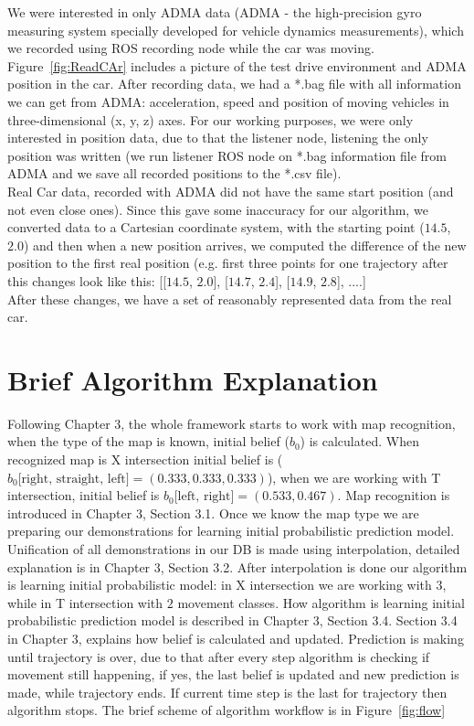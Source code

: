 We were interested in only \gls{ADMA} data (\gls{ADMA} - the high-precision gyro measuring system specially developed for vehicle dynamics measurements), which we recorded using \gls{ROS} recording node while the car was moving. Figure~\ref{fig:ReadCAr} includes a picture of the test drive environment and \gls{ADMA} position in the car. After recording data, we had a *.bag file with all information we can get from \gls{ADMA}: acceleration, speed and position of moving vehicles in three-dimensional (x, y, z) axes. For our working purposes, we were only interested in position data, due to that the listener node, listening the only position was written (we run listener \gls{ROS} node on *.bag information file from \gls{ADMA} and we save all recorded positions to the *.csv file). \\
Real Car data, recorded with \gls{ADMA} did not have the same start position (and not even close ones). Since this gave some inaccuracy for our algorithm, we converted data to a Cartesian coordinate system, with the starting point ($14.5$, $2.0$) and then when a new position arrives, we computed the difference of the new position to the first real position (e.g. first three points for one trajectory after this changes look like this: [[$14.5$, $2.0$], [$14.7$, $2.4$], [$14.9$, $2.8$], ....] \\
After these changes, we have a set of reasonably represented data from the real car.

\section{Brief Algorithm Explanation}

Following Chapter 3, the whole framework starts to work with map recognition, when the type of the map is known, initial belief ($b_{0}$) is calculated. When recognized map is X intersection initial belief is ($b_{0}\text{[right, straight, left]} = (0.333, 0.333, 0.333)$), when we are working with T intersection, initial belief is $b_0 \text{[left, right]}= (0.533, 0.467)$. Map recognition is introduced in Chapter 3, Section 3.1.
Once we know the map type we are preparing our demonstrations for learning initial probabilistic prediction model. Unification of all demonstrations in our \gls{DB} is made using interpolation, detailed explanation is in Chapter 3, Section 3.2. After interpolation is done our algorithm is learning initial probabilistic model: in X intersection we are working with $3$, while in T intersection with $2$ movement classes. How algorithm is learning initial probabilistic prediction model is described in Chapter 3, Section 3.4.
Section 3.4 in Chapter 3, explains how belief is calculated and updated. Prediction is making until trajectory is over, due to that after every step algorithm is checking if movement still happening, if yes, the last belief is updated and new prediction is made, while trajectory ends. If current time step is the last for trajectory then algorithm stops. The brief scheme of algorithm workflow is in Figure~\ref{fig:flow}

